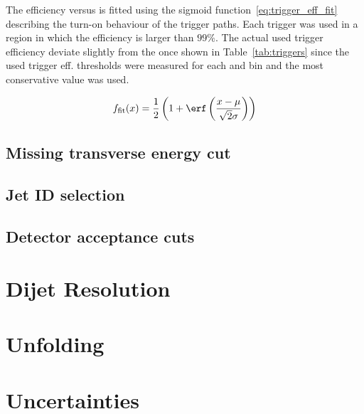 The efficiency versus \ptavg is fitted using the sigmoid function~\ref{eq:trigger_eff_fit} describing
the turn-on behaviour of the trigger paths. Each trigger was used in a region in which the efficiency
is larger than $99\%$. The actual used trigger efficiency deviate slightly from the once shown in Table~\ref{tab:triggers}
since the used trigger eff. thresholds were measured for each \ystar and \yboost bin and the most
conservative value was used.


\begin{equation}
\label{eq:trigger_eff_fit}
    f_{\text{fit}} (x) = \frac{1}{2} \left( 1 + \erf \left(\frac{x-\mu}{\sqrt{2}\sigma}\right)\right)
\end{equation}



\subsection{Missing transverse energy cut}
\subsection{Jet ID selection}
\subsection{Detector acceptance cuts}

\section{Dijet Resolution}

\section{Unfolding}

\section{Uncertainties}
